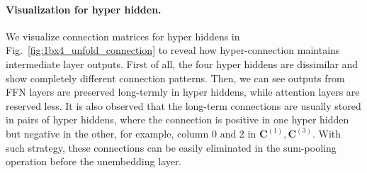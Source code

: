 \paragraph{Visualization for hyper hidden.}
We visualize connection matrices for hyper hiddens in Fig.~\ref{fig:1bx4_unfold_connection} to reveal how hyper-connection maintains intermediate layer outputs.
First of all, the four hyper hiddens are dissimilar and show completely different connection patterns. Then, we can see outputs from FFN layers are preserved long-termly in hyper hiddens, while attention layers are reserved less. It is also observed that the long-term connections are usually stored in pairs of hyper hiddens, where the connection is positive in one hyper hidden but negative in the other, for example, column 0 and 2 in $\mathbf{C}^{(1)},\mathbf{C}^{(3)}$. With such strategy, these connections can be easily eliminated in the sum-pooling operation before the unembedding layer.

